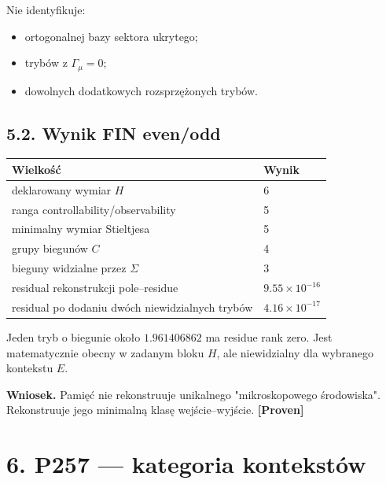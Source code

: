\documentclass[11pt,a4paper,openany]{report}
\newcommand{\statusProven}{\textcolor{fingreen}{[Proven]}}
\begin{document}
Nie identyfikuje:

\begin{itemize}
\item 
ortogonalnej bazy sektora ukrytego;

\item 
trybów z \(\Gamma_\mu=0\);

\item 
dowolnych dodatkowych rozsprzę\.zonych trybów.

\end{itemize}

\section{5.2. Wynik FIN even/\allowbreak{}odd}

\begin{center}
\begingroup\small
\setlength{\tabcolsep}{2.5pt}
\renewcommand{\arraystretch}{1.16}
\begin{longtable}{@{}p{}p{}@{}}
\toprule
\textbf{Wielkość} & \textbf{Wynik} \\
\midrule
\endhead
deklarowany wymiar \(H\) & 6 \\
ranga controllability/\allowbreak{}observability & 5 \\
minimalny wymiar Stieltjesa & 5 \\
grupy biegunów \(C\) & 4 \\
bieguny widzialne przez \(\Sigma\) & 3 \\
residual rekonstrukcji pole--residue & \(9.55\times10^{-16}\) \\
residual po dodaniu dwóch niewidzialnych trybów & \(4.16\times10^{-17}\) \\
\bottomrule
\end{longtable}
\endgroup
\end{center}

Jeden tryb o biegunie około \(1.961406862\) ma residue rank zero. Jest matematycznie obecny w zadanym bloku \(H\), ale niewidzialny dla wybranego kontekstu \(E\).

\textbf{Wniosek.} Pamięć nie rekonstruuje unikalnego "mikroskopowego środowiska". Rekonstruuje jego minimalną klasę wejście--wyjście. \textbf{\statusProven{}}

\chapter{6. P257 --- kategoria kontekstów}
\end{document}
